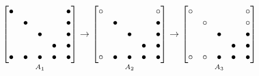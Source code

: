 \documentclass{standalone}
\begin{document}
\begin{equation*}
\mathop{
\begin{bmatrix}
\bullet & \space & \space & \space & \bullet \\
\space & \bullet & \space & \space & \bullet \\
\space & \space & \bullet & \space & \bullet \\
\space & \space & \space & \bullet & \bullet \\
\bullet & \bullet & \bullet & \bullet & \bullet \\
\end{bmatrix}
}\limits_{A_1}
\rightarrow
\mathop{
\begin{bmatrix}
\circ & \space & \space & \space & \circ \\
\space & \bullet & \space & \space & \bullet \\
\space & \space & \bullet & \space & \bullet \\
\space & \space & \space & \bullet & \bullet \\
\circ & \bullet & \bullet & \bullet & \bullet \\
\end{bmatrix}
}\limits_{A_2}
\rightarrow
\mathop{
\begin{bmatrix}
\circ & \space & \space & \space & \circ \\
\space & \circ & \space & \space & \circ \\
\space & \space & \bullet & \space & \bullet \\
\space & \space & \space & \bullet & \bullet \\
\circ & \circ & \bullet & \bullet & \bullet \\
\end{bmatrix}
}\limits_{A_3}
\end{equation*}
\end{document}
